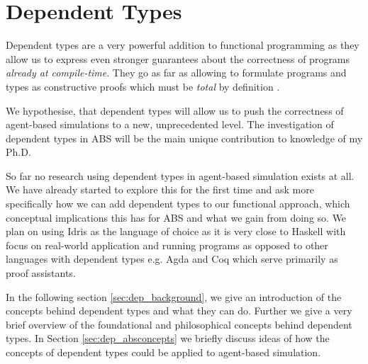 \chapter{Dependent Types}
\label{chap:dependent_types}
Dependent types are a very powerful addition to functional programming as they allow us to express even stronger guarantees about the correctness of programs \textit{already at compile-time}. They go as far as allowing to formulate programs and types as constructive proofs which must be \textit{total} by definition \cite{thompson_type_1991, mckinna_why_2006, altenkirch_pi_2010}. 

We hypothesise, that  dependent types will allow us to push the correctness of agent-based simulations to a new, unprecedented level. The investigation of dependent types in ABS will be the main unique contribution to knowledge of my Ph.D.

So far no research using dependent types in agent-based simulation exists at all. We have already started to explore this for the first time and ask more specifically how we can add dependent types to our functional approach, which conceptual implications this has for ABS and what we gain from doing so. We plan on using Idris \cite{brady_idris_2013} as the language of choice as it is very close to Haskell with focus on real-world application and running programs as opposed to other languages with dependent types e.g. Agda and Coq which serve primarily as proof assistants.

In the following section \ref{sec:dep_background}, we give an introduction of the concepts behind dependent types and what they can do. Further we give a very brief overview of the foundational and philosophical concepts behind dependent types. In Section \ref{sec:dep_absconcepts} we briefly discuss ideas of how the concepts of dependent types could be applied to agent-based simulation.



